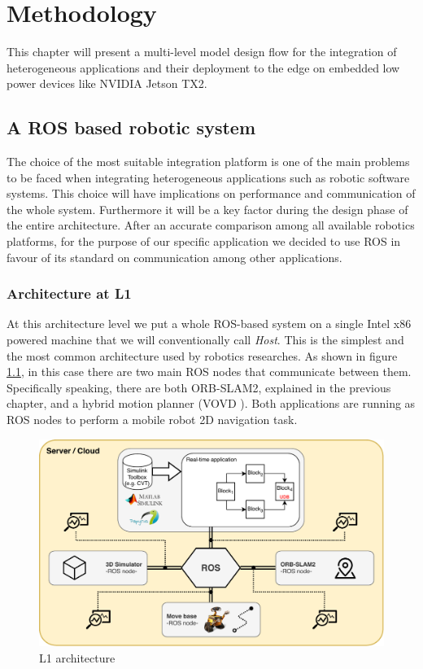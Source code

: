\chapter{Methodology} \label{chap:methodology}

% 

This chapter will present a multi-level model design flow for the integration of heterogeneous applications and their deployment to the edge on embedded low power devices like NVIDIA Jetson TX2.


\section{A ROS based robotic system}
The choice of the most suitable integration platform is one of the main problems to be faced when integrating heterogeneous applications such as robotic software systems. This choice will have implications on performance and communication of the whole system. Furthermore it will be a key factor during the design phase of the entire architecture.
After an accurate comparison among all available robotics platforms, for the purpose of our specific application we decided to use ROS \cite{ROS} in favour of its standard on communication among other applications.

\subsection{Architecture at L1}
At this architecture level we put a whole ROS-based system on a single Intel x86 powered machine that we will conventionally call \textit{Host}. 
This is the simplest and the most common architecture used by robotics researches. As shown in figure \ref{fig:l1arch}, in this case there are two main ROS nodes that communicate between them. Specifically speaking, there are both ORB-SLAM2, explained in the previous chapter, and a hybrid motion planner (VOVD \cite{VOVD}). Both applications are running as ROS nodes to perform a mobile robot 2D navigation task.

\begin{figure}
	\centering
	\includegraphics[width=\textwidth]{images/L1-arch}
	\caption{L1 architecture}
	\label{fig:l1arch}
\end{figure}

